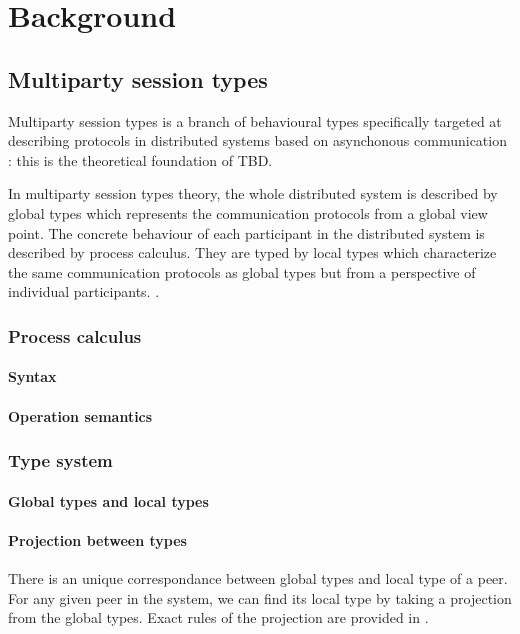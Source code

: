 \chapter{Background}
\section{Multiparty session types} 
Multiparty session types is a branch of behavioural types specifically targeted at describing protocols in distributed systems based on asynchonous communication \cite{coppoGentleIntroductionMultiparty2015}: this is the theoretical foundation of TBD.

In multiparty session types theory, the whole distributed system is described by global types which represents the communication protocols from a global view point. The concrete behaviour of each participant in the distributed system is described by process calculus. They are typed by local types which characterize the same communication protocols as global types but from a perspective of individual participants. \cite{coppoGentleIntroductionMultiparty2015}. 
\subsection{Process calculus}
\subsubsection{Syntax}
\subsubsection{Operation semantics}
\subsection{Type system}
\subsubsection{Global types and local types}
\subsubsection{Projection between types}
There is an unique correspondance between global types and local type of a peer. For any given peer in the system, we can find its local type by taking a projection from the global types. Exact rules of the projection are provided in \cite{coppoGentleIntroductionMultiparty2015}.

